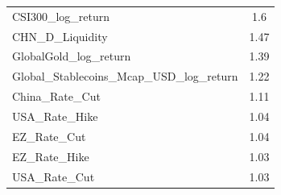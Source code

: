 \begin{table}[h]
\begin{tabular}{lc}
    CSI300\_log\_return & 1.6 \\ 
    CHN\_D\_Liquidity & 1.47 \\ 
    GlobalGold\_log\_return & 1.39 \\ 
    Global\_Stablecoins\_Mcap\_USD\_log\_return & 1.22 \\ 
    China\_Rate\_Cut & 1.11 \\ 
    USA\_Rate\_Hike & 1.04 \\ 
    EZ\_Rate\_Cut & 1.04 \\ 
    EZ\_Rate\_Hike & 1.03 \\ 
    USA\_Rate\_Cut & 1.03 \\ 
    \bottomrule
  \end{tabular}
\end{table}